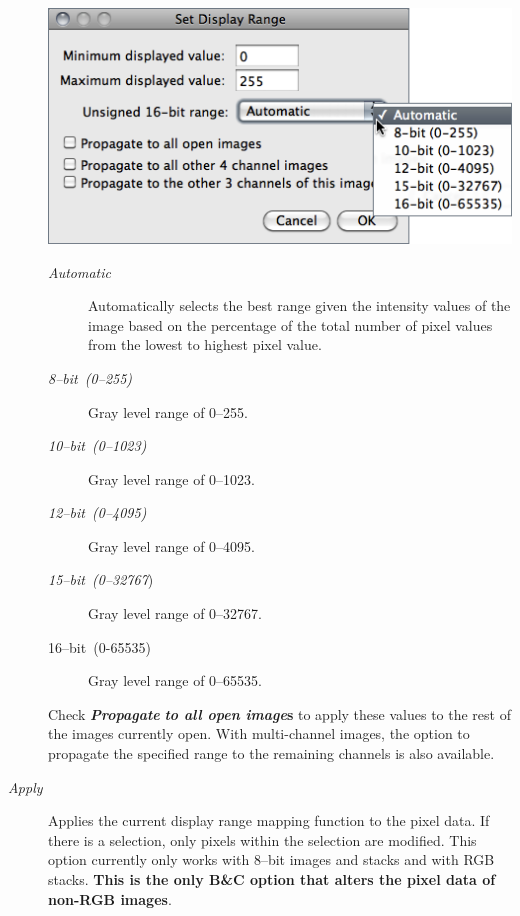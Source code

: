 \begin{description}
\noindent \begin{center}
\includegraphics[scale=0.55]{images/SetDisplayRange}
\par\end{center}
\begin{description}
\item [{\emph{Automatic}}] Automatically selects the best range given the
intensity values of the image based on the percentage of the total
number of pixel values from the lowest to highest pixel value. 
\item [{\emph{8--bit\ (0--255)}}] Gray level range of 0--255. 
\item [{\emph{10--bit\ (0--1023)}}] Gray level range of 0--1023.
\item [{\emph{12--bit\ (0--4095)}}] Gray level range of 0--4095.
\item [{\emph{15--bit\ (0--32767})}] Gray level range of 0--32767.
\item [{16--bit\emph{\ }(0-65535)}] Gray level range of 0--65535.
\end{description}

\improvement{}Check \textbf{\emph{Propagate}}\textbf{ }\textbf{\emph{to
all open image}}\textbf{s} to apply these values to the rest of the
images currently open. With multi-channel images, the option to propagate
the specified range to the remaining channels is also available.

\item [{\emph{Apply}}] Applies the current display range mapping function
to the pixel data. If there is a selection, only pixels within the
selection are modified. This option currently only works with 8--bit
images and stacks and with RGB stacks. \textbf{This is the only B\&C
option that alters the pixel data of non-RGB images}.
\end{description}


